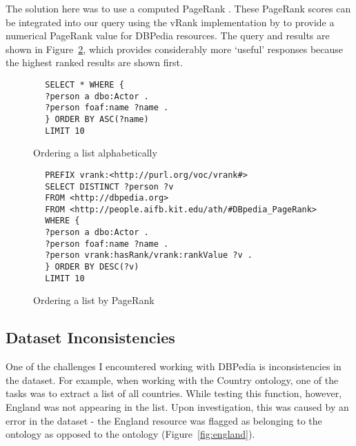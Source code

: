 The solution here was to use a computed PageRank \cite{rank2014}. These PageRank scores can be integrated into our query using the vRank implementation by \citet{rank2012} to provide a numerical PageRank value for DBPedia resources. The query and results are shown in Figure~\ref{fig:ranked}, which provides considerably more `useful' responses because the highest ranked results are shown first.

\newsavebox\unrankbox
\begin{lrbox}{\unrankbox}
	\begin{lstlisting}
		SELECT * WHERE {
		?person a dbo:Actor .
		?person foaf:name ?name .
		} ORDER BY ASC(?name)
		LIMIT 10
	\end{lstlisting}
\end{lrbox}

\begin{figure}[p]
	\centering
	 \qquad
	\caption{Ordering a list alphabetically}
	\label{fig:unranked}
\end{figure}

\newsavebox\rankbox
\begin{lrbox}{\rankbox}
	\begin{lstlisting}
		PREFIX vrank:<http://purl.org/voc/vrank#>
		SELECT DISTINCT ?person ?v
		FROM <http://dbpedia.org>
		FROM <http://people.aifb.kit.edu/ath/#DBpedia_PageRank>
		WHERE {
		?person a dbo:Actor .
		?person foaf:name ?name .
		?person vrank:hasRank/vrank:rankValue ?v .
		} ORDER BY DESC(?v)
		LIMIT 10
	\end{lstlisting}
\end{lrbox}

\begin{figure}[p]
	\centering
	 \qquad
	\caption{Ordering a list by PageRank}
	\label{fig:ranked}
\end{figure}

\subsection{Dataset Inconsistencies}
\label{sec:dataset}
One of the challenges I encountered working with DBPedia is inconsistencies in the dataset. For example, when working with the Country ontology, one of the tasks was to extract a list of all countries. While testing this function, however, England was not appearing in the list. Upon investigation, this was caused by an error in the dataset - the England resource was flagged as belonging to the  ontology as opposed to the  ontology (Figure~\ref{fig:england}).

